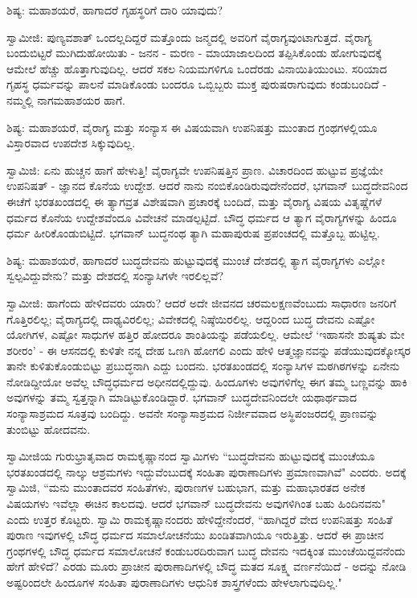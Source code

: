 ಶಿಷ್ಯ: ಮಹಾಶಯರೆ, ಹಾಗಾದರೆ ಗೃಹಸ್ಥರಿಗೆ ದಾರಿ ಯಾವುದು?

ಸ್ವಾಮೀಜಿ: ಪುಣ್ಯವಶಾತ್ ಒಂದಲ್ಲದಿದ್ದರೆ ಮತ್ತೊಂದು ಜನ್ಮದಲ್ಲಿ ಅವರಿಗೆ ವೈರಾಗ್ಯವುಂಟಾಗುತ್ತದೆ. ವೈರಾಗ್ಯ ಬಂದುಬಿಟ್ಟರೆ ಮುಗಿದುಹೋಯಿತು - ಜನನ - ಮರಣ - ಮಾಯಾಜಾಲದಿಂದ ತಪ್ಪಿಸಿಕೊಂಡು ಹೋಗುವುದಕ್ಕೆ ಆಮೇಲೆ ಹೆಚ್ಚು ಹೊತ್ತಾಗುವುದಿಲ್ಲ. ಆದರೆ ಸಕಲ ನಿಯಮಗಳಿಗೂ ಒಂದೆರಡು ವಿನಾಯಿತಿಯುಂಟು. ಸರಿಯಾದ ಗೃಹಸ್ಥ ಧರ್ಮವನ್ನು ಪಾಲನೆ ಮಾಡಿಕೊಂಡು ಬಂದರೂ ಒಬ್ಬಿಬ್ಬರು ಮುಕ್ತ ಪುರುಷರಾಗುವುದು ಕಂಡುಬಂದಿದೆ - ನಮ್ಮಲ್ಲಿ ನಾಗಮಹಾಶಯರ ಹಾಗೆ.

ಶಿಷ್ಯ: ಮಹಾಶಯರೆ, ವೈರಾಗ್ಯ ಮತ್ತು ಸಂನ್ಯಾಸ ಈ ವಿಷಯವಾಗಿ ಉಪನಿಷತ್ತು ಮುಂತಾದ ಗ್ರಂಥಗಳಲ್ಲಿಯೂ ವಿಸ್ತಾರವಾದ ಉಪದೇಶ ಸಿಕ್ಕುವುದಿಲ್ಲ.

ಸ್ವಾಮಿಜಿ: ಏನು ಹುಚ್ಚನ ಹಾಗೆ ಹೇಳುತ್ತಿ! ವೈರಾಗ್ಯವೇ ಉಪನಿಷತ್ತಿನ ಪ್ರಾಣ. ವಿಚಾರದಿಂದ ಹುಟ್ಟುವ ಪ್ರಜ್ಞೆಯೇ ಉಪನಿಷತ್ - ಜ್ಞಾನದ ಕೊನೆಯ ಉದ್ದೇಶ. ಆದರೆ ನಾನು ನಂಬಿಕೊಂಡಿರುವುದೇನೆಂದರೆ, ಭಗವಾನ್ ಬುದ್ಧದೇವನಿಂದ ಈಚೆಗೆ ಭರತಖಂಡದಲ್ಲಿ ಈ ತ್ಯಾಗವ್ರತ ವಿಶೇಷವಾಗಿ ಪ್ರಚಾರಕ್ಕೆ ಬಂದಿದೆ, ಮತ್ತು ವೈರಾಗ್ಯ ವಿಷಯ ವಿತೃಷ್ಣೆಗಳೆ ಧರ್ಮದ ಕೊನೆಯ ಉದ್ದೇಶವೆಂದೂ ವಿವೇಚನೆ ಮಾಡಲ್ಪಟ್ಟಿದೆ. ಬೌದ್ಧ ಧರ್ಮದ ಆ ತ್ಯಾಗ ವೈರಾಗ್ಯಗಳನ್ನು ಹಿಂದೂ ಧರ್ಮ ಹೀರಿಕೊಂಡುಬಿಟ್ಟಿದೆ. ಭಗವಾನ್ ಬುದ್ಧನಂಥ ತ್ಯಾಗಿ ಮಹಾಪುರುಷ ಪ್ರಪಂಚದಲ್ಲಿ ಮತ್ತೊಬ್ಬ ಹುಟ್ಟಿಲ್ಲ.

ಶಿಷ್ಯ: ಮಹಾಶಯರೆ, ಹಾಗಾದರೆ ಬುದ್ಧದೇವನು ಹುಟ್ಟುವುದಕ್ಕೆ ಮುಂಚೆ ದೇಶದಲ್ಲಿ ತ್ಯಾಗ ವೈರಾಗ್ಯಗಳು ಎಲ್ಲೋ ಸ್ವಲ್ಪವಿದ್ದುವೇನು? ಮತ್ತು ದೇಶದಲ್ಲಿ ಸಂನ್ಯಾಸಿಗಳೇ ಇರಲಿಲ್ಲವೆ?

ಸ್ವಾಮೀಜಿ: ಹಾಗೆಂದು ಹೇಳಿದವರು ಯಾರು? ಆದರೆ ಅದೇ ಜೀವನದ ಚರಮಲಕ್ಷಣವೆಂಬುದು ಸಾಧಾರಣ ಜನರಿಗೆ ಗೊತ್ತಿರಲಿಲ್ಲ; ವೈರಾಗ್ಯದಲ್ಲಿ ದಾಢ್ಯವಿರಲಿಲ್ಲ; ವಿವೇಕದಲ್ಲಿ ನಿಷ್ಠೆಯಿರಲಿಲ್ಲ. ಆದ್ದರಿಂದ ಬುದ್ಧ ದೇವನು ಎಷ್ಟೋ ಯೋಗಿಗಳ, ಎಷ್ಟೋ ಸಾಧುಗಳ ಹತ್ತಿರ ಹೋದರೂ ಶಾಂತಿಯನ್ನು ಪಡೆಯಲಿಲ್ಲ. ಆಮೇಲೆ ‘ಇಹಾಸನೇ ಶುಷ್ಯತು ಮೇ ಶರೀರಂ’ - ಈ ಆಸನದಲ್ಲಿ ಕುಳಿತೇ ನನ್ನ ದೇಹ ಒಣಗಿ ಹೋಗಲಿ ಎಂದು ಹೇಳಿ ಆತ್ಮಜ್ಞಾನವನ್ನು ಪಡೆಯುವುದಕ್ಕೋಸ್ಕರ ತಾನೇ ಕುಳಿತುಕೊಂಡುಬಿಟ್ಟು ಪ್ರಬುದ್ಧನಾಗಿ ಎದ್ದು ಬಂದನು. ಭರತಖಂಡದಲ್ಲಿ ಸಂನ್ಯಾಸಿಗಳ ಮಠಗಿಠಗಳನ್ನು ಏನೇನು ನೋಡಿದ್ದೀಯೋ ಅವೆಲ್ಲ ಬೌದ್ಧಧರ್ಮದ ಅಧೀನದಲ್ಲಿದ್ದುವು. ಹಿಂದೂಗಳು ಅವುಗಳಿಗೆಲ್ಲ ಈಗ ತಮ್ಮ ಬಣ್ಣವನ್ನು ಹಾಕಿ ಅವುಗಳನ್ನು ತಮ್ಮ ಸ್ವತ್ತನ್ನಾಗಿ ಮಾಡಿಟ್ಟುಕೊಂಡಿದ್ದಾರೆ. ಭಗವಾನ್ ಬುದ್ಧದೇವನಿಂದಲೇ ಯಥಾರ್ಥವಾದ ಸಂನ್ಯಾಸಾಶ್ರಮದ ಸೂತ್ರವು ಬಂದಿದ್ದು. ಅವನೇ ಸಂನ್ಯಾಸಾಶ್ರಮದ ನಿರ್ಜೀವವಾದ ಅಸ್ಥಿಪಂಜರದಲ್ಲಿ ಪ್ರಾಣವನ್ನು ತುಂಬಿಟ್ಟು ಹೋದವನು.

ಸ್ವಾಮೀಜಿಯ ಗುರುಭ್ರಾತೃವಾದ ರಾಮಕೃಷ್ಣಾನಂದ ಸ್ವಾಮಿಗಳು “ಬುದ್ಧದೇವನು ಹುಟ್ಟುವುದಕ್ಕೆ ಮುಂಚೆಯೂ ಭರತಖಂಡದಲ್ಲಿ ನಾಲ್ಕು ಆಶ್ರಮಗಳು ಇದ್ದುವೆಂಬುದಕ್ಕೆ ಸಂಹಿತಾ ಪುರಾಣಾದಿಗಳು ಪ್ರಮಾಣವಾಗಿವೆ" ಎಂದರು. ಅದಕ್ಕೆ ಸ್ವಾಮಿಜಿ, “ಮನು ಮುಂತಾದವರ ಸಂಹಿತೆಗಳು, ಪುರಾಣಗಳ ಬಹುಭಾಗ, ಮತ್ತು ಮಹಾಭಾರತದ ಅನೇಕ ವಿಷಯಗಳು ಇವೆಲ್ಲಾ ಈಚಿನ ಕಾಲದವು. ಆದರೆ ಭಗವಾನ್ ಬುದ್ಧದೇವನು ಅವುಗಳಿಗಿಂತ ಬಹು ಹಿಂದಿನವನು" ಎಂದು ಉತ್ತರ ಕೊಟ್ಟರು. ಸ್ವಾಮಿ ರಾಮಕೃಷ್ಣಾನಂದರು ಹೇಳಿದ್ದೇನೆಂದರೆ, “ಹಾಗಿದ್ದರೆ ವೇದ ಉಪನಿಷತ್ತು ಸಂಹಿತೆ ಪುರಾಣ ಇವುಗಳಲ್ಲಿ ಬೌದ್ಧ ಧರ್ಮದ ಸಮಾಲೋಚನೆಯು ಖಂಡಿತವಾಗಿಯೂ ಇರುತ್ತಿತ್ತು. ಆದರೆ ಈ ಪ್ರಾಚೀನ ಗ್ರಂಥಗಳಲ್ಲಿ ಬೌದ್ಧ ಧರ್ಮದ ಸಮಾಲೋಚನೆ ಕಂಡುಬರದಿರುವಾಗ ಬುದ್ಧ ದೇವನು ಇದಕ್ಕಿಂತ ಮುಂಚೆಯಿದ್ದವನೆಂದು ಹೇಗೆ ಹೇಳಿದೆ? ಎರಡು ಮೂರು ಪ್ರಾಚೀನ ಪುರಾಣಾದಿಗಳಲ್ಲಿ ಬೌದ್ಧ ಮತದ ಸೂಕ್ಷ್ಮ ವರ್ಣನೆಯಿದೆ - ಅದನ್ನು ನೋಡಿ ಅಷ್ಟರಿಂದಲೇ ಹಿಂದೂಗಳ ಸಂಹಿತಾ ಪುರಾಣಾದಿಗಳು ಆಧುನಿಕ ಶಾಸ್ತ್ರಗಳೆಂದು ಹೇಳಲಾಗುವುದಿಲ್ಲ."

